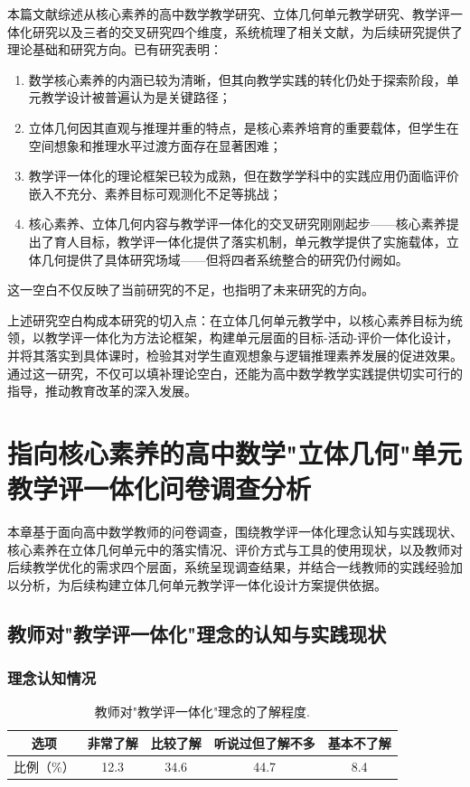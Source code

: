 \documentclass[UTF8,a4paper,12pt,twoside]{ctexart}
\begin{document}
本篇文献综述从核心素养的高中数学教学研究、立体几何单元教学研究、教学评一体化研究以及三者的交叉研究四个维度，系统梳理了相关文献，为后续研究提供了理论基础和研究方向。已有研究表明：
\begin{enumerate}
\item 数学核心素养的内涵已较为清晰，但其向教学实践的转化仍处于探索阶段，单元教学设计被普遍认为是关键路径；
\item 立体几何因其直观与推理并重的特点，是核心素养培育的重要载体，但学生在空间想象和推理水平过渡方面存在显著困难；
\item 教学评一体化的理论框架已较为成熟，但在数学学科中的实践应用仍面临评价嵌入不充分、素养目标可观测化不足等挑战；
\item 核心素养、立体几何内容与教学评一体化的交叉研究刚刚起步——核心素养提出了育人目标，教学评一体化提供了落实机制，单元教学提供了实施载体，立体几何提供了具体研究场域——但将四者系统整合的研究仍付阙如。
\end{enumerate}
这一空白不仅反映了当前研究的不足，也指明了未来研究的方向。

上述研究空白构成本研究的切入点：在立体几何单元教学中，以核心素养目标为统领，以教学评一体化为方法论框架，构建单元层面的目标-活动-评价一体化设计，并将其落实到具体课时，检验其对学生直观想象与逻辑推理素养发展的促进效果。通过这一研究，不仅可以填补理论空白，还能为高中数学教学实践提供切实可行的指导，推动教育改革的深入发展。

\section{指向核心素养的高中数学"立体几何"单元教学评一体化问卷调查分析}

本章基于面向高中数学教师的问卷调查，围绕教学评一体化理念认知与实践现状、核心素养在立体几何单元中的落实情况、评价方式与工具的使用现状，以及教师对后续教学优化的需求四个层面，系统呈现调查结果，并结合一线教师的实践经验加以分析，为后续构建立体几何单元教学评一体化设计方案提供依据。

\subsection{教师对"教学评一体化"理念的认知与实践现状}

\subsubsection{理念认知情况}

\begin{center}
\begin{table}[H]
\begin{tabular}{|c|c|c|c|c|}
\hline
选项 & 非常了解 & 比较了解 & 听说过但了解不多 & 基本不了解 \\
\hline
比例（\%） & 12.3 & 34.6 & 44.7 & 8.4 \\
\hline
\end{tabular}
\caption{\label{tab3.1}教师对"教学评一体化"理念的了解程度.}
\end{table}
\end{center}
\end{document}
